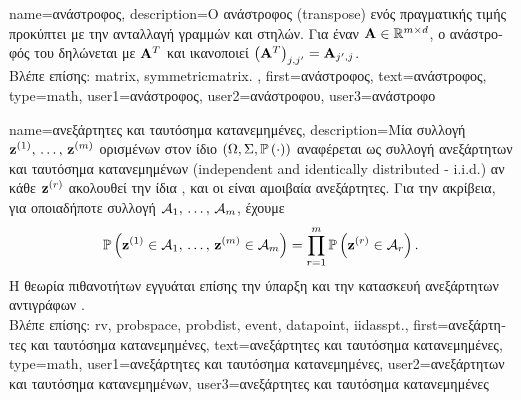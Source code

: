 {name={\foreignlanguage{greek}{ανάστροφος}},
	description={\foreignlanguage{greek}{Ο ανάστροφος} (transpose) 
		\foreignlanguage{greek}{ενός}  \foreignlanguage{greek}{πραγματικής τιμής προκύπτει με την 
		ανταλλαγή γραμμών και στηλών. Για έναν}  ${\bf A} \in \mathbb{R}^{m \times d}$, 
		\foreignlanguage{greek}{ο ανάστροφός του δηλώνεται με ${\bf A}^{T}$ και ικανοποιεί} 
		$\big({\bf A}^{T}\big)_{j,j'}={\bf A}_{j',j}$.
		\\
		\foreignlanguage{greek}{Βλέπε επίσης:} \gls{matrix}, \gls{symmetricmatrix}. },
 	first={\foreignlanguage{greek}{ανάστροφος}},
 	text={\foreignlanguage{greek}{ανάστροφος}},
	type=math,
	user1={\foreignlanguage{greek}{ανάστροφος}}, %
  	user2={\foreignlanguage{greek}{ανάστροφου}}, %
	user3={\foreignlanguage{greek}{ανάστροφο}} %
 }

{name={\foreignlanguage{greek}{ανεξάρτητες και ταυτόσημα κατανεμημένες}}, 
	description={\foreignlanguage{greek}{Μία συλλογή}  ${\bf z}^{(1)}, \,\ldots, \,{\bf z}^{(m)}$ 
		\foreignlanguage{greek}{ορισμένων στον ίδιο} \linebreak $(\Omega, \Sigma, \mathbb{P}\left(\cdot\right))$ 
		\foreignlanguage{greek}{αναφέρεται ως συλλογή ανεξάρτητων και ταυτόσημα κατανεμημένων}
		(independent and identically distributed - i.i.d.) 
		\foreignlanguage{greek}{αν κάθε ${\bf z}^{(r)}$ ακολουθεί την ίδια} ,  
		\foreignlanguage{greek}{και οι}  \foreignlanguage{greek}{είναι αμοιβαία ανεξάρτητες. 
		Για την ακρίβεια, για οποιαδήποτε συλλογή}  $\mathcal{A}_1, \,\ldots, \,\mathcal{A}_m$, 
		\foreignlanguage{greek}{έχουμε}
       		\[
          		\mathbb{P}\left( {\bf z}^{(1)} \in \mathcal{A}_1, \,\ldots, \,{\bf z}^{(m)} \in \mathcal{A}_{m}\right) 
         		= \prod_{r=1}^{m} \mathbb{P}\left( {\bf z}^{(r)} \in \mathcal{A}_r\right).
         	\]
		\foreignlanguage{greek}{Η θεωρία πιθανοτήτων εγγυάται επίσης την ύπαρξη και την κατασκευή ανεξάρτητων αντιγράφων} 
		 \cite[\foreignlanguage{greek}{Θεώρημα} 2.19]{klenke2020probability}.
		\\
		\foreignlanguage{greek}{Βλέπε επίσης:} \gls{rv}, \gls{probspace}, \gls{probdist}, \gls{event}, \gls{datapoint}, \gls{iidasspt}.},
	first={\foreignlanguage{greek}{ανεξάρτητες και ταυτόσημα κατανεμημένες}},
	text={\foreignlanguage{greek}{ανεξάρτητες και ταυτόσημα κατανεμημένες}},
	type=math,
	user1={\foreignlanguage{greek}{ανεξάρτητες και ταυτόσημα κατανεμημένες}}, %
  	user2={\foreignlanguage{greek}{ανεξάρτητων και ταυτόσημα κατανεμημένων}}, %
	user3={\foreignlanguage{greek}{ανεξάρτητες και ταυτόσημα κατανεμημένες}} %
}

